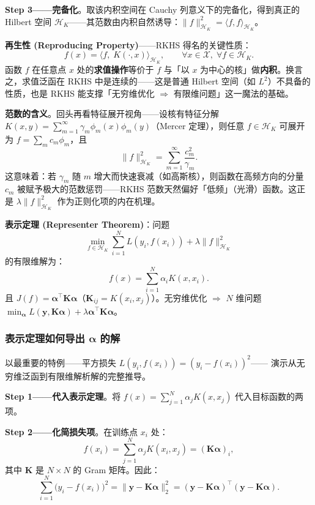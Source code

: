 \textbf{Step 3——完备化}。取该内积空间在 Cauchy 列意义下的完备化，得到真正的 Hilbert 空间 $\mathcal{H}_K$——其范数由内积自然诱导：$\|f\|_{\mathcal{H}_K}^2 = \langle f, f\rangle_{\mathcal{H}_K}$。

\textbf{再生性 (Reproducing Property)}——RKHS 得名的关键性质：
\begin{equation}\label{eq:reproducing}
    \boxed{f(x) = \big\langle f,\; K(\cdot, x) \big\rangle_{\mathcal{H}_K}, \qquad \forall x \in \mathcal{X},\; \forall f \in \mathcal{H}_K.}
\end{equation}
函数 $f$ 在任意点 $x$ 处的\textbf{求值操作}等价于 $f$ 与「以 $x$ 为中心的核」做\textbf{内积}。换言之，求值泛函在 RKHS 中是连续的——这是普通 Hilbert 空间（如 $L^2$）不具备的性质，也是 RKHS 能支撑「无穷维优化 $\Rightarrow$ 有限维问题」这一魔法的基础。

\textbf{范数的含义}。回头再看特征展开视角——设核有特征分解 $K(x,y) = \sum_{m=1}^{\infty} \gamma_m \phi_m(x)\phi_m(y)$（Mercer 定理），则任意 $f \in \mathcal{H}_K$ 可展开为 $f = \sum_{m} c_m \phi_m$，且
\[
\|f\|_{\mathcal{H}_K}^2 = \sum_{m=1}^{\infty} \frac{c_m^2}{\gamma_m}.
\]
这意味着：若 $\gamma_m$ 随 $m$ 增大而快速衰减（如高斯核），则函数在高频方向的分量 $c_m$ 被赋予极大的范数惩罚——RKHS 范数天然偏好「低频」（光滑）函数。这正是 $\lambda \|f\|_{\mathcal{H}_K}^2$ 作为正则化项的内在机理。

\textbf{表示定理 (Representer Theorem)}：问题
\[
\min_{f \in \mathcal{H}_K} \sum_{i=1}^{N} L(y_i, f(x_i)) + \lambda \|f\|_{\mathcal{H}_K}^2
\]
的有限维解为：
\[
\boxed{f(x) = \sum_{i=1}^{N} \alpha_i K(x, x_i)}.
\]
且 $J(f) = \boldsymbol{\alpha}^\top \mathbf{K} \boldsymbol{\alpha}$（$\mathbf{K}_{ij} = K(x_i, x_j)$）。无穷维优化 $\Rightarrow$ $N$ 维问题 $\min_{\boldsymbol{\alpha}} L(\mathbf{y}, \mathbf{K}\boldsymbol{\alpha}) + \lambda \boldsymbol{\alpha}^\top\mathbf{K}\boldsymbol{\alpha}$。

\subsubsection{表示定理如何导出 $\boldsymbol{\alpha}$ 的解}

以最重要的特例——平方损失 $L(y_i, f(x_i)) = (y_i - f(x_i))^2$—— 演示从无穷维泛函到有限维解析解的完整推导。

\textbf{Step 1——代入表示定理}。将 $f(x) = \sum_{j=1}^{N} \alpha_j K(x, x_j)$ 代入目标函数的两项。

\textbf{Step 2——化简损失项}。在训练点 $x_i$ 处：
\[
f(x_i) = \sum_{j=1}^{N} \alpha_j K(x_i, x_j) = (\mathbf{K}\boldsymbol{\alpha})_i,
\]
其中 $\mathbf{K}$ 是 $N \times N$ 的 Gram 矩阵。因此：
\[
\sum_{i=1}^{N} \big(y_i - f(x_i)\big)^2 = \|\mathbf{y} - \mathbf{K}\boldsymbol{\alpha}\|_2^2 = (\mathbf{y} - \mathbf{K}\boldsymbol{\alpha})^\top (\mathbf{y} - \mathbf{K}\boldsymbol{\alpha}).
\]

